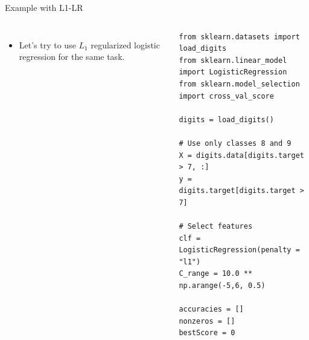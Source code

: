 \documentclass[10pt, aspectratio=169]{beamer} %
\begin{document}
\begin{frame}[fragile,allowframebreaks=0.8]{Example with L1-LR}
\begin{columns}
\begin{itemize}
\item Let's try to use $L_1$ regularized logistic regression for the same task.
\end{itemize}
\begin{lstlisting}
from sklearn.datasets import load_digits
from sklearn.linear_model import LogisticRegression
from sklearn.model_selection import cross_val_score

digits = load_digits()

# Use only classes 8 and 9
X = digits.data[digits.target > 7, :]
y = digits.target[digits.target > 7]

# Select features
clf = LogisticRegression(penalty = "l1")
C_range = 10.0 ** np.arange(-5,6, 0.5)

accuracies = []
nonzeros = []
bestScore = 0


\end{lstlisting}
\end{columns}
\end{frame}
\end{document}

